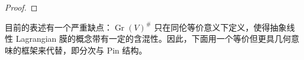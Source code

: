 \begin{proof}
\end{proof}

目前的表述有一个严重缺点：$\operatorname{Gr}(V)^\#$ 只在同伦等价意义下定义，使得抽象线性 Lagrangian 膜的概念带有一定的含混性。因此，下面用一个等价但更具几何意味的框架来代替，即分次与 Pin 结构。
